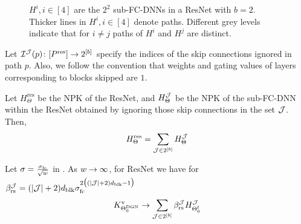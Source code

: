 \begin{figure}[h]
\caption{\small{$H^i,i\in[4]$ are the $2^2$ sub-FC-DNNs in a ResNet with $b=2$. Thicker lines in $H^i,i\in[4]$ denote paths. Different grey levels indicate that for $i\neq j$ paths of $H^i$ and $H^j$ are distinct.}}
\label{fig:subfcdnn}
\end{figure}
\begin{notation}
Let $\mathcal{I}^{\mathcal{J}}(p)\colon [P^{\text{res}}]\rightarrow 2^{[b]}$ specify the indices of the skip connections ignored in path $p$.  Also, we follow the convention that weights and gating values of layers corresponding to blocks skipped are $1$.
\end{notation}

\begin{lemma}\label{lm:sumofproduct}
Let $H^{\text{res}}_{\Theta}$ be the NPK of the ResNet, and $H^{\mathcal{J}}_{\Theta}$ be the NPK of the sub-FC-DNN within the ResNet obtained by ignoring those skip connections in the set $\mathcal{J}$. Then, \begin{align*}H^{\text{res}}_{\Theta}=\sum_{\mathcal{J}\in 2^{[b]}}H^{\mathcal{J}}_{\Theta}\end{align*}
\end{lemma}

\begin{theorem}\label{th:main} Let $\sigma=\frac{\sigma_{\text{fc}}}{\sqrt{w}}$ in . As $w\rightarrow\infty$, for ResNet we have for $\beta_{\text{rs}}^{\mathcal{J}} = (|\mathcal{J}| +2)d_{\text{blk}} \sigma_{\text{fc}}^{2\big( (|\mathcal{J}|+2)d_{\text{blk}}-1\big)}$
\begin{align*}
K^{\text{v}}_{\Theta^{\text{DGN}}_0}\rightarrow \sum_{\mathcal{J}\in 2^{[b]}}  \beta_{\text{rs}}^{\mathcal{J}} H^{\mathcal{J}}_{\Theta^{\textrm{f}}_0}
\end{align*}
\end{theorem}